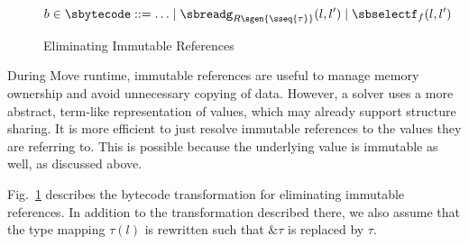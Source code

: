 \begin{figure}[t!]
  \[
    b \in \sbytecode ::= \ldots \mid \sbreadg_{R\sgen{\sseq{\tau}}}(l, l')
    \mid \sbselectf_f(l, l')
  \]
  \vspace*{2ex}
  \caption{Eliminating Immutable References}
  \label{fig:EliminateImmutable}
\end{figure}

During Move runtime, immutable references are useful to manage memory ownership
and avoid unnecessary copying of data.  However, a solver uses a more abstract, term-like
representation of values, which may already support structure sharing. It is
more efficient to just resolve immutable references to the values they are referring to.
This is possible because the underlying value is immutable as well, as discussed above.

Fig.~\ref{fig:EliminateImmutable} describes the bytecode transformation for
eliminating immutable references. In addition to the transformation described
there, we also assume that the type mapping $\tau(l)$ is rewritten such that
$\& \tau$ is replaced by $\tau$.



